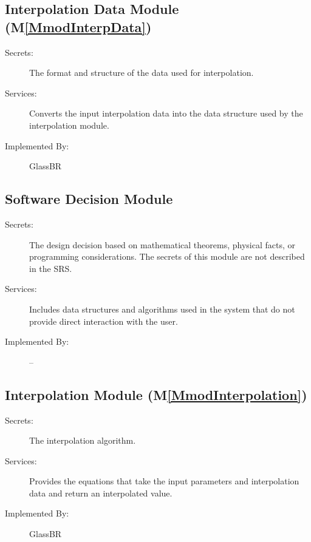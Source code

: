 \documentclass[12pt]{article}
\begin{document}
\subsection{Interpolation Data Module (M\ref{MmodInterpData})}
\label{Sec:InteDatuModu()}
\begin{description}
\item[Secrets:]The format and structure of the data used for interpolation.
\item[Services:]Converts the input interpolation data into the data structure used by the interpolation module.
\item[Implemented By:]GlassBR
\end{description}
\subsection{Software Decision Module}
\label{Sec:SoftDeciModu}
\begin{description}
\item[Secrets:]The design decision based on mathematical theorems, physical facts, or programming considerations. The secrets of this module are not described in the SRS.
\item[Services:]Includes data structures and algorithms used in the system that do not provide direct interaction with the user.
\item[Implemented By:]--
\end{description}
\subsection{Interpolation Module (M\ref{MmodInterpolation})}
\label{Sec:InteModu()}
\begin{description}
\item[Secrets:]The interpolation algorithm.
\item[Services:]Provides the equations that take the input parameters and interpolation data and return an interpolated value.
\item[Implemented By:]GlassBR
\end{description}
\end{document}
